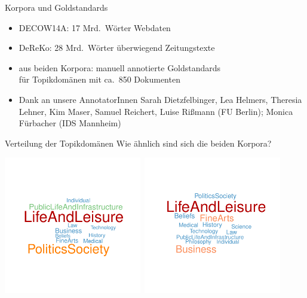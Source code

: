 \documentclass{beamer}
\begin{document}
\begin{frame}
  {Korpora und Goldstandards}
  \begin{itemize}
    \item DECOW14A: 17 Mrd.\ Wörter Webdaten\\
      \citep{SchaeferBildhauer2012a,SchaeferBildhauer2013de,Schaefer2015b}
    \item DeReKo: 28 Mrd.\ Wörter überwiegend Zeitungstexte\\
      \citep{KupietzEa2010}
      \vspace{0.5cm}
    \item aus beiden Korpora: manuell annotierte Goldstandards\\
      für Topikdomänen mit ca.\ 850 Dokumenten
      \vspace{0.5cm}
    \item {\footnotesize Dank an unsere AnnotatorInnen Sarah Dietzfelbinger, Lea Helmers, Theresia Lehner, Kim Maser, Samuel Reichert, Luise Rißmann (FU Berlin); Monica Fürbacher (IDS Mannheim)}
  \end{itemize}
\end{frame}

\begin{frame}
  {Verteilung der Topikdomänen}
  Wie ähnlich sind sich die beiden Korpora?\\[1cm]
  \begin{center}
    \includegraphics[width=0.45\textwidth]{dereko}~\includegraphics[width=0.45\textwidth]{cow}
  \end{center}
\end{frame}
\end{document}
